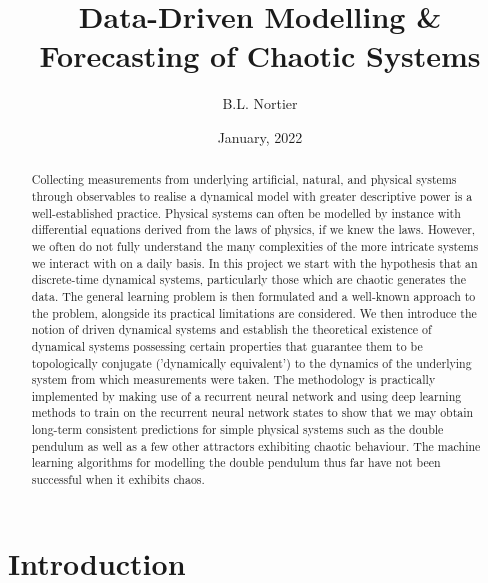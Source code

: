 \documentclass[a4paper,12pt,twoside]{report}
\begin{document}
\title{Data-Driven Modelling \& \\ Forecasting of Chaotic Systems}



\author{B.L. Nortier} 
\date{January, 2022}
\date{}
\maketitle


\begin{abstract}
  Collecting measurements from underlying artificial, natural, and physical systems through observables to realise a dynamical model with greater descriptive power is a well-established practice. Physical systems can often be modelled by instance with differential equations derived from the laws of physics, if we knew the laws.  However, we often do not fully understand the many complexities of the more intricate systems we interact with on a daily basis.
  In this project we start with the hypothesis that an discrete-time dynamical systems, particularly those which are chaotic generates the data. The general learning problem is then formulated and a well-known approach to the problem, alongside its practical limitations are considered.
  We then introduce the notion of driven dynamical systems and establish the theoretical existence of dynamical systems possessing certain properties that guarantee them to be topologically conjugate ('dynamically equivalent') to the dynamics of the underlying system from which measurements were taken. The methodology is practically implemented by making use of a recurrent neural network and using deep learning methods to train on the recurrent neural network states to show that we may obtain long-term consistent predictions for simple physical systems such as the double pendulum as well as a few other attractors exhibiting chaotic behaviour. The machine learning algorithms for modelling the double pendulum thus far have not been successful when it exhibits chaos. 
  \end{abstract}

  \tableofcontents

\chapter{Introduction}\label{ch1}
\end{document}
